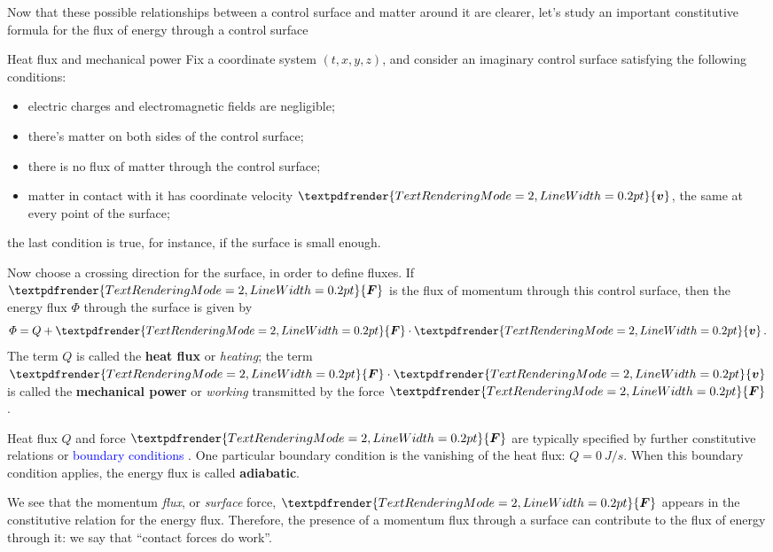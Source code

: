 \documentclass[a4paper,12pt,%
onecolumn,oneside,%
british%
]{memoir}
\renewcommand*{\bm}[1]{\textpdfrender{TextRenderingMode=2,LineWidth=0.2pt}{\boldsymbol{#1}}}
\renewcommand*{\|}[1][]{\nonscript\:#1\vert\nonscript\:\mathopen{}}
\newcommand*{\sect}{\S}%
\renewcommand*{\autoref}[3][\sect\,\ref]{\textcolor{blue}{#3}
\raisebox{0.6ex}{\color{blue}\miniscule%
\faIcon{angle-right}%
\;#1{#2}\;p.\,\pageref{#2}}}
\newcommand*{\yv}{\bm{v}}
\newcommand*{\yH}{\varPhi}%
\newcommand*{\yQ}{Q}%
\newcommand*{\yF}{\bm{F}}
\begin{document}
Now that these possible relationships between a control surface and matter around it are clearer, let's study an important constitutive formula for the flux of energy through a control surface
\begin{definition}{Heat flux and mechanical power}\label{def:heatflux_mechpower}
  Fix a coordinate system $(t,x,y,z)$, and consider an imaginary control surface satisfying the following conditions:
\begin{itemize}[noitemsep]
\item electric charges and electromagnetic fields are negligible;
\item there's matter on both sides of the control surface;
\item there is no flux of matter through the control surface;
\item matter in contact with it has coordinate velocity $\yv$, the same at every point of the surface;
\end{itemize}
the last condition is true, for instance, if the surface is small enough.

  \smallskip

  Now choose a crossing direction for the surface, in order to define fluxes. If $\yF$ is the flux of momentum through this control surface, then the energy flux $\yH$ through the surface is given by
\begin{equation}
  \label{eq:heat_power}
  \yH = \yQ + \yF\cdot \yv \,.
\end{equation}
The term $\yQ$ is called the \textbf{heat flux} or \emph{heating}; the  term $\yF\cdot \yv$ is called the \textbf{mechanical power} or \emph{working} transmitted by the force $\yF$.

\smallskip

Heat flux $\yQ$ and force $\yF$ are typically specified by further constitutive relations or \autoref{sec:boundary_conds}{boundary conditions}. One particular boundary condition is the vanishing of the heat flux: $\yQ=\qty{0}{J/s}$. When this boundary condition applies, the energy flux is called \textbf{adiabatic}.
\end{definition}

We see that the momentum \emph{flux}, or \emph{surface} force, $\yF$ appears in the constitutive relation for the energy flux. Therefore, the presence of a momentum flux through a surface can contribute to the flux of energy through it: we say that \enquote{contact forces do work}.
\end{document}
